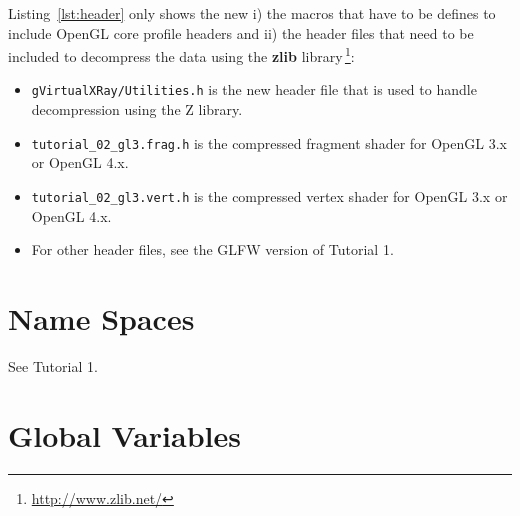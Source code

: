 \documentclass[11pt,oneside,a4paper,final]{article}
\begin{document}
Listing~\ref{lst:header} only shows the new i) the macros that have to be defines to include 
OpenGL core profile headers and ii) the header files that need to be included to decompress the data using the \textbf{zlib} library\,\footnote{\url{http://www.zlib.net/}}:
\begin{itemize}
 \item \verb+gVirtualXRay/Utilities.h+ is the new header file that is used to handle decompression using the Z library. 
 \item \verb+tutorial_02_gl3.frag.h+ is the compressed fragment shader for OpenGL 3.x or OpenGL 4.x. 
 \item \verb+tutorial_02_gl3.vert.h+ is the compressed vertex shader for OpenGL 3.x or OpenGL 4.x. 
 \item For other header files, see the GLFW version of Tutorial 1.
\end{itemize}

\begin{center}

\end{center}


\section{Name Spaces}
\label{sec:Name Spaces}

See Tutorial 1.


\section{Global Variables}
\label{sec:Global Variables}
\end{document}
